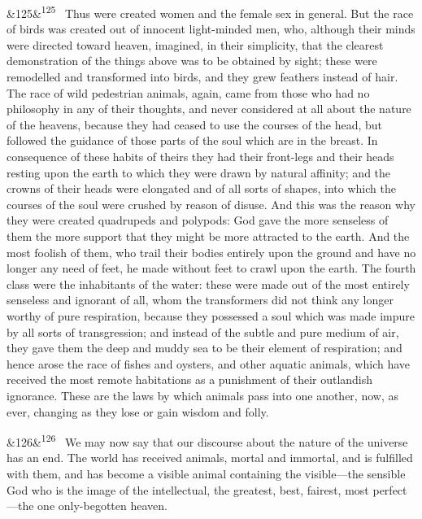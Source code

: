 \documentclass[12pt]{article}
\newcommand{\para}[1][]{\par\noindent\ifx&#1&\else\textsuperscript{\footnotesize #1}~\fi}
\begin{document}
\para[125] Thus were created women and the female sex in general. But the race of birds was created out of innocent light-minded men, who, although their minds were directed toward heaven, imagined, in their simplicity, that the clearest demonstration of the things above was to be obtained by sight; these were remodelled and transformed into birds, and they grew feathers instead of hair. The race of wild pedestrian animals, again, came from those who had no philosophy in any of their thoughts, and never considered at all about the nature of the heavens, because they had ceased to use the courses of the head, but followed the guidance of those parts of the soul which are in the breast. In consequence of these habits of theirs they had their front-legs and their heads resting upon the earth to which they were drawn by natural affinity; and the crowns of their heads were elongated and of all sorts of shapes, into which the courses of the soul were crushed by reason of disuse. And this was the reason why they were created quadrupeds and polypods: God gave the more senseless of them the more support that they might be more attracted to the earth. And the most foolish of them, who trail their bodies entirely upon the ground and have no longer any need of feet, he made without feet to crawl upon the earth. The fourth class were the inhabitants of the water: these were made out of the most entirely senseless and ignorant of all, whom the transformers did not think any longer worthy of pure respiration, because they possessed a soul which was made impure by all sorts of transgression; and instead of the subtle and pure medium of air, they gave them the deep and muddy sea to be their element of respiration; and hence arose the race of fishes and oysters, and other aquatic animals, which have received the most remote habitations as a punishment of their outlandish ignorance. These are the laws by which animals pass into one another, now, as ever, changing as they lose or gain wisdom and folly.

\para[126] We may now say that our discourse about the nature of the universe has an end. The world has received animals, mortal and immortal, and is fulfilled with them, and has become a visible animal containing the visible---the sensible God who is the image of the intellectual, the greatest, best, fairest, most perfect---the one only-begotten heaven.
\end{document}
